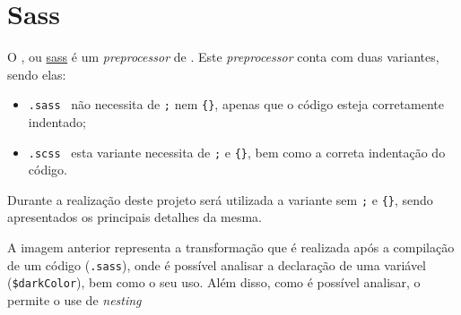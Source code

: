 \section{Sass}

\begin{minipage}{.3\textwidth}
\end{minipage}
\begin{minipage}{.7\textwidth}
	\minipagerestore
	O \textbf{}, ou \underline{\acrlong{sass}} é um \textit{preprocessor} de \textbf{}. Este \textit{preprocessor} conta com duas variantes, sendo elas:
	
	\begin{itemize}
		\item \texttt{.sass} \textemdash~não necessita de \texttt{;} nem \verb|{}|, apenas que o código esteja corretamente indentado;
		\item \texttt{.scss} \textemdash~esta variante necessita de \texttt{;} e \verb|{}|, bem como a correta indentação do código.
	\end{itemize}
\end{minipage}

Durante a realização deste projeto será utilizada a variante sem \texttt{;} e \verb|{}|, sendo apresentados os principais detalhes da mesma.


A imagem anterior representa a transformação que é realizada após a compilação de um código \textbf{} (\texttt{.sass}), onde é possível analisar a declaração de uma variável (\verb|$darkColor|), bem como o seu uso. Além disso, como é possível analisar, o \textbf{} permite o use de \textit{nesting} %